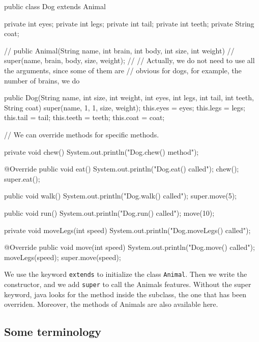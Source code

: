 \begin{listing}{1}
public class Dog extends Animal { 

    private int eyes;
    private int legs;
    private int tail;
    private int teeth;
    private String coat;
    
    // public Animal(String name, int brain, int body, int size, int weight) {
        // super(name, brain, body, size, weight);
    // }
    // Actually, we do not need to use all the arguments, since some of them are 
    // obvious for dogs, for example, the number of brains, we do 

    public Dog(String name, int size, int weight, int eyes, int legs, int tail, int teeth, String coat) {
        super(name, 1, 1, size, weight);
            this.eyes = eyes;
            this.legs = legs;
            this.tail = tail;
            this.teeth = teeth;
            this.coat = coat;
    }
    
    // We can override methods for specific methods. 

    private void chew() {
       System.out.println("Dog.chew() method");
    }
    
    @Override
    public void eat() {
        System.out.println("Dog.eat() called");
        chew();
        super.eat();
    }
    
    public void walk() {
        System.out.println("Dog.walk() called");
        super.move(5);
    }
    
    public void run() {
        System.out.println("Dog.run() called");
        move(10);
    }

    private void moveLegs(int speed) {
        System.out.println("Dog.moveLegs() called");
    }

    @Override
    public void move(int speed) {
        System.out.println("Dog.move() called");
        moveLegs(speed);
        super.move(speed);
    }

}
\end{listing}
We use the keyword \verb|extends| to initialize the class \verb|Animal|. Then we 
write the constructor, and we add \verb|super| to call the Animals features.
Without the super keyword, java looks for the method inside the subclass, the 
one that has been overriden. Moreover, the methods of Animals are also available 
here. 

\subsection{Some terminology}


